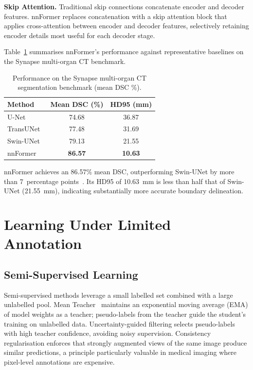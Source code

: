 \documentclass[preprint,12pt,authoryear]{elsarticle}
\begin{document}
\textbf{Skip Attention.} Traditional skip connections concatenate encoder and
decoder features. nnFormer replaces concatenation with a skip attention block
that applies cross-attention between encoder and decoder features, selectively
retaining encoder details most useful for each decoder stage.

Table~\ref{tab:nnformer} summarises nnFormer's performance against
representative baselines on the Synapse multi-organ CT benchmark.

\begin{table}[t]
\caption{Performance on the Synapse multi-organ CT segmentation benchmark
(mean DSC \%).}
\label{tab:nnformer}
\centering
\begin{tabular}{@{}lcc@{}}
\toprule
\textbf{Method} & \textbf{Mean DSC (\%)} & \textbf{HD95 (mm)} \\
\midrule
U-Net~\citep{ronneberger2015unet} & 74.68 & 36.87 \\
TransUNet~\citep{chen2021transunet} & 77.48 & 31.69 \\
Swin-UNet~\citep{cao2022swinunet} & 79.13 & 21.55 \\
nnFormer~\citep{zhou2023nnformer} & \textbf{86.57} & \textbf{10.63} \\
\bottomrule
\end{tabular}
\end{table}

nnFormer achieves an 86.57\% mean DSC, outperforming Swin-UNet by more than
7~percentage points~\citep{zhou2023nnformer}. Its HD95 of 10.63~mm is less than
half that of Swin-UNet (21.55~mm), indicating substantially more accurate
boundary delineation.

\section{Learning Under Limited Annotation}
\label{sec:weakly}

\subsection{Semi-Supervised Learning}
\label{sec:ssl}

Semi-supervised methods leverage a small labelled set combined with a large
unlabelled pool. Mean Teacher~\citep{tarvainen2017} maintains an exponential
moving average (EMA) of model weights as a teacher; pseudo-labels from the
teacher guide the student's training on unlabelled data. Uncertainty-guided
filtering selects pseudo-labels with high teacher confidence, avoiding noisy
supervision. Consistency regularisation enforces that strongly augmented views
of the same image produce similar predictions, a principle particularly
valuable in medical imaging where pixel-level annotations are expensive.
\end{document}
